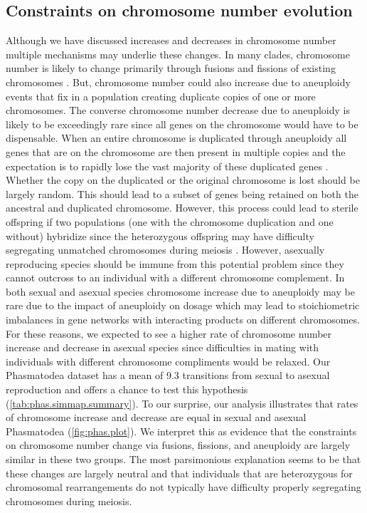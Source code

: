\subsection{Constraints on chromosome number evolution}
Although we have discussed increases and decreases in chromosome number multiple mechanisms may underlie these changes.
In many clades, chromosome number is likely to change primarily through fusions and fissions of existing chromosomes \citep{sved2016, blackmon2019meiotic}.
But, chromosome number could also increase due to aneuploidy events that fix in a population creating duplicate copies of one or more chromosomes.
The converse chromosome number decrease due to aneuploidy is likely to be exceedingly rare since all genes on the chromosome would have to be dispensable.
When an entire chromosome is duplicated through aneuploidy all genes that are on the chromosome are then present in multiple copies and the expectation is to rapidly lose the vast majority of these duplicated genes \citep{ohno}.
Whether the copy on the duplicated or the original chromosome is lost should be largely random.
This should lead to a subset of genes being retained on both the ancestral and duplicated chromosome.
However, this process could lead to sterile offspring if two populations (one with the chromosome duplication and one without) hybridize since the heterozygous offspring may have difficulty segregating unmatched chromosomes during meiosis \citep{white1978}.
However, asexually reproducing species should be immune from this potential problem since they cannot outcross to an individual with a different chromosome complement. 
In both sexual and asexual species chromosome increase due to aneuploidy may be rare due to the impact of aneuploidy on dosage which may lead to stoichiometric imbalances in gene networks with interacting products on different chromosomes.
For these reasons, we expected to see a higher rate of chromosome number increase and decrease in asexual species since difficulties in mating with individuals with different chromosome compliments would be relaxed.
Our Phasmatodea dataset has a mean of 9.3 transitions from sexual to asexual reproduction and offers a chance to test this hypothesis (\cref{tab:phas.simmap.summary}).
To our surprise, our analysis illustrates that rates of chromosome increase and decrease are equal in sexual and asexual Phasmatodea (\cref{fig:phas.plot}).
We interpret this as evidence that the constraints on chromosome number change via fusions, fissions, and aneuploidy are largely similar in these two groups. 
The most parsimonious explanation seems to be that these changes are largely neutral and that individuals that are heterozygous for chromosomal rearrangements do not typically have difficulty properly segregating chromosomes during meiosis.

